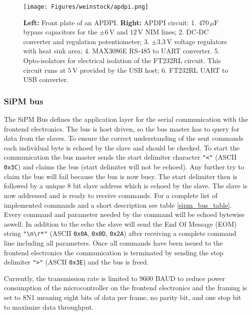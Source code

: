 \documentclass[]{article}
\begin{document}
	\begin{figure}[t]
		\centering
			\texttt{[image: Figures/weinstock/apdpi.png]}
		\caption{\textbf{Left:} Front plate of an APDPI. \textbf{Right:} APDPI circuit: 1. $470\,\mu \text{F}$ bypass capacitors for the $\pm6\,\text{V}$ and $12\,\text{V}$ 
												   NIM lines;
												2. DC-DC converter and regulation potentiometer;
												3. $\pm3.3\,\text{V}$ voltage regulators with heat sink area;
												4. MAX3086E RS-485 to UART converter.
												5. Opto-isolators for electrical isolation of the FT232RL circuit. This circuit runs
												at $5\,\text{V}$ provided by the USB host;
												6. FT232RL UART to USB converter.}
		\label{APDPI_front}
	\end{figure}	

\subsubsection{SiPM bus}

The SiPM Bus defines the application layer for the serial communication with the frontend electronics. The bus is host driven, so the bus master has to query for data from the slaves.
To ensure the correct understanding of the sent commands each individual byte is echoed by the slave and should be checked. To start the communication the bus master sends the start
delimiter character \verb|"<"| (ASCII \verb|0x3C|) and claims the bus (start delimiter will not be echoed). Any further try to claim the bus will fail because the bus is now busy. 
The start delimiter then is followed by a unique 8 bit slave address which is echoed by the slave. The slave is now addressed and is ready to receive commands. For a complete list of
implemented commands and a short description see table \ref{sipm_bus_table}. Every command and parameter needed by the command will be echoed bytewise aswell. In addition to the echo 
the slave will send the End Of Message (EOM) string \verb|"\n\r*"| (ASCII \verb|0x0A|, \verb|0x0D|, \verb|0x2A|) after receiving a complete command line including all parameters. Once all commands have been issued to the frontend electronics the communication is terminated by sending the stop delimiter \verb|">"| (ASCII \verb|0x3E|) and the bus is freed. 

Currently, the transmission rate is limited to 9600 BAUD to reduce power consumption of the microcontroller on the frontend electronics and the framing is set to 8N1 meaning eight 
bits of data per frame, no parity bit, and one stop bit to maximize data throughput.
\end{document}
